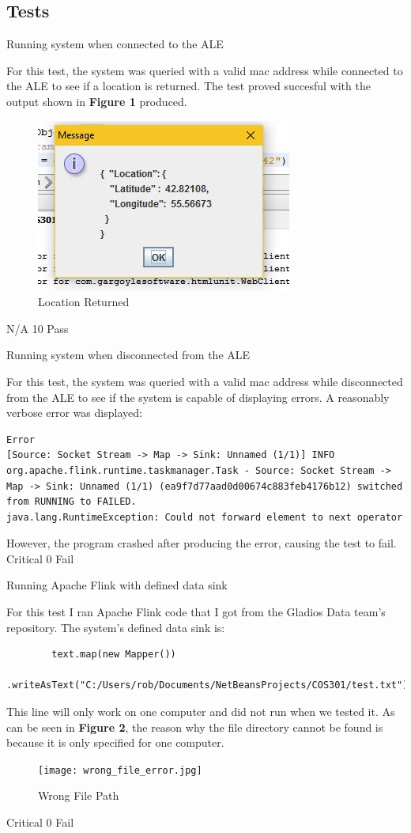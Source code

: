\subsection{Tests}

\FuncReq
{Running system when connected to the ALE}
{For this test, the system was queried with a valid mac address while connected to the ALE to see if a location is returned. The test proved succesful with the output shown in \textbf{Figure 1} produced.
			\begin{figure}[h]
				\centering
				\includegraphics{functional/images/right_mac.jpg}
				\caption{Location Returned}
				\label{fig:LocationReturned}
			\end{figure}
}
{N/A}
{10}
{Pass}

\FuncReq
{Running system when disconnected from the ALE}
{For this test, the system was queried with a valid mac address while disconnected from the ALE to see if the system is capable of displaying errors. A reasonably verbose error was displayed: 
\begin{verbatim}
Error
[Source: Socket Stream -> Map -> Sink: Unnamed (1/1)] INFO org.apache.flink.runtime.taskmanager.Task - Source: Socket Stream -> Map -> Sink: Unnamed (1/1) (ea9f7d77aad0d00674c883feb4176b12) switched from RUNNING to FAILED.
java.lang.RuntimeException: Could not forward element to next operator
\end{verbatim}
}
However, the program crashed after producing the error, causing the test to fail.
{Critical}
{0}
{Fail}

\FuncReq
{Running Apache Flink with defined data sink}
{For this test I ran Apache Flink code that I got from the Gladios Data team's repository.
 The system's defined data sink is:
	\begin{verbatim}
		text.map(new Mapper())
		.writeAsText("C:/Users/rob/Documents/NetBeansProjects/COS301/test.txt");
	\end{verbatim}
This line will only work on one computer and did not run when we tested it. As can be seen in \textbf{Figure 2}, the reason why the file directory cannot be found is because it is only specified for one computer.
			\begin{figure}[h]
				\centering
				\texttt{[image: wrong\_file\_error.jpg]}
				\caption{Wrong File Path}
				\label{fig:WrongFIlePath}
			\end{figure} 
}
{Critical}
{0}
{Fail}
		
